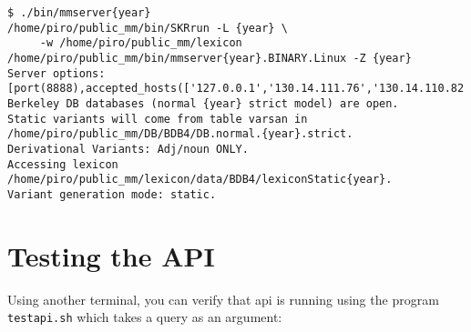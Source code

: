 \documentclass[11pt]{article}
\begin{document}
\begin{verbatim}
$ ./bin/mmserver{year}
/home/piro/public_mm/bin/SKRrun -L {year} \
     -w /home/piro/public_mm/lexicon /home/piro/public_mm/bin/mmserver{year}.BINARY.Linux -Z {year}
Server options: [port(8888),accepted_hosts(['127.0.0.1','130.14.111.76','130.14.110.82'])]
Berkeley DB databases (normal {year} strict model) are open.
Static variants will come from table varsan in /home/piro/public_mm/DB/BDB4/DB.normal.{year}.strict.
Derivational Variants: Adj/noun ONLY.
Accessing lexicon /home/piro/public_mm/lexicon/data/BDB4/lexiconStatic{year}.
Variant generation mode: static.
\end{verbatim}



\section{Testing the API}
\label{Testing the API}

Using another terminal, you can verify that api is running using the
program \texttt{testapi.sh} which takes a query as an argument:
\end{document}
